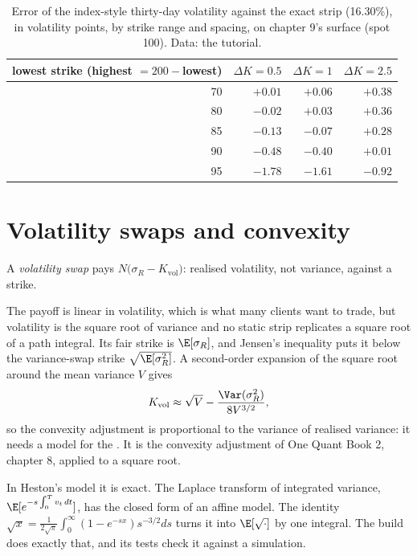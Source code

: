 \begin{table}[ht]
\centering
\begin{tabular}{rrrr}
\toprule
lowest strike (highest $=200-$lowest) & $\Delta K=0.5$ & $\Delta K=1$ & $\Delta K=2.5$\\
\midrule
70 & $+0.01$ & $+0.06$ & $+0.38$\\
80 & $-0.02$ & $+0.03$ & $+0.36$\\
85 & $-0.13$ & $-0.07$ & $+0.28$\\
90 & $-0.48$ & $-0.40$ & $+0.01$\\
95 & $-1.78$ & $-1.61$ & $-0.92$\\
\bottomrule
\end{tabular}
\caption{Error of the index-style thirty-day volatility against the exact strip (16.30\%), in volatility points,
by strike range and spacing, on chapter 9's surface (spot 100). Data: the tutorial.}\label{tab:dv:variance-swaps-and-volatility-derivatives:errors}
\end{table}

\section{Volatility swaps and convexity}

\begin{definition}\label{def:dv:variance-swaps-and-volatility-derivatives:volswap}
A \emph{volatility swap} pays $N\bigl(\sigma_R-K_{\mathrm{vol}}\bigr)$: realised
volatility, not variance, against a strike.
\end{definition}

The payoff is linear in volatility, which is what many clients want to trade, but volatility is the square
root of variance and no static strip replicates a square root of a path integral. Its fair strike is
$\E[\sigma_R]$, and Jensen's inequality puts it below the variance-swap strike $\sqrt{\E[\sigma_R^2]}$. A
second-order expansion of the square root around the mean variance $V$ gives
\[
K_{\mathrm{vol}}\approx\sqrt V-\frac{\Var(\sigma_R^2)}{8V^{3/2}},
\]
so the convexity adjustment is proportional to the variance of realised variance: it needs a model for the
. It is the convexity adjustment of One Quant Book 2, chapter 8, applied to a square
root.

In Heston's model it is exact. The Laplace transform of integrated variance,
$\E[e^{-s\int_0^Tv_t\,dt}]$, has the closed form of an affine model. The identity
$\sqrt x=\frac1{2\sqrt\pi}\int_0^\infty(1-e^{-sx})s^{-3/2}ds$ turns it into $\E[\sqrt{\cdot}]$ by one
integral. The build does exactly that, and its tests check it against a simulation.

